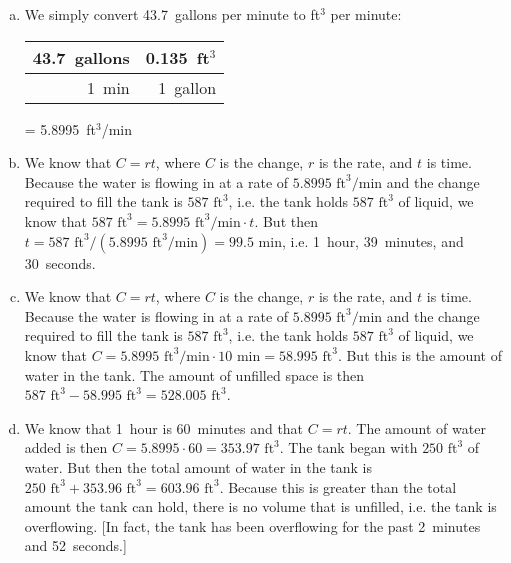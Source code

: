 \documentclass[11pt,letterpaper]{article}
\begin{document}
\sol
\begin{enumerate}[(a)]
\item We simply convert 43.7~gallons per minute to ft$^3$ per minute: \par
	\begin{table}[!ht]
	\centering
	\begin{tabular}{r|r}
	43.7~gallons & 0.135~ft$^3$ \\ \hline
	1~min	     & 1~gallon
	\end{tabular}
	= 5.8995~ft$^3$/min
	\end{table} \pspace

\item We know that $C= rt$, where $C$ is the change, $r$ is the rate, and $t$ is time. Because the water is flowing in at a rate of $5.8995 \text{ ft}^3/\text{min}$ and the change required to fill the tank is $587 \text{ ft}^3$, i.e. the tank holds $587 \text{ ft}^3$ of liquid, we know that $587 \text{ ft}^3= 5.8995 \text{ ft}^3/\text{min} \cdot t$. But then $t= 587 \text{ ft}^3/(5.8995 \text{ ft}^3/\text{min})= 99.5 \text{ min}$, i.e. 1~hour, 39~minutes, and 30~seconds. \pspace

\item We know that $C= rt$, where $C$ is the change, $r$ is the rate, and $t$ is time. Because the water is flowing in at a rate of $5.8995 \text{ ft}^3/\text{min}$ and the change required to fill the tank is $587 \text{ ft}^3$, i.e. the tank holds $587 \text{ ft}^3$ of liquid, we know that $C= 5.8995 \text{ ft}^3/\text{min} \cdot 10 \text{ min}= 58.995 \text{ ft}^3$. But this is the amount of water in the tank. The amount of unfilled space is then $587 \text{ ft}^3 - 58.995 \text{ ft}^3= 528.005 \text{ ft}^3$. \pspace

\item We know that 1~hour is 60~minutes and that $C= rt$. The amount of water added is then $C= 5.8995 \cdot 60= 353.97 \text{ ft}^3$. The tank began with $250 \text{ ft}^3$ of water. But then the total amount of water in the tank is $250 \text{ ft}^3 + 353.96 \text{ ft}^3= 603.96 \text{ ft}^3$. Because this is greater than the total amount the tank can hold, there is no volume that is unfilled, i.e. the tank is overflowing. [In fact, the tank has been overflowing for the past 2~minutes and 52~seconds.]
\end{enumerate}



\newpage
\end{document}
